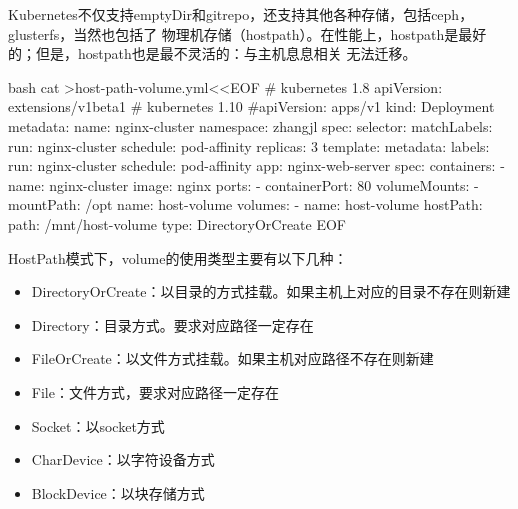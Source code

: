 Kubernetes不仅支持emptyDir和gitrepo，还支持其他各种存储，包括ceph，glusterfs，当然也包括了
物理机存储（hostpath）。在性能上，hostpath是最好的；但是，hostpath也是最不灵活的：与主机息息相关
无法迁移。
\begin{code-block}{bash}
cat >host-path-volume.yml<<EOF
# kubernetes 1.8
apiVersion: extensions/v1beta1
# kubernetes 1.10
#apiVersion: apps/v1
kind: Deployment
metadata:
  name: nginx-cluster
  namespace: zhangjl
spec:
  selector:
    matchLabels:
      run: nginx-cluster
      schedule: pod-affinity
  replicas: 3
  template:
    metadata:
      labels:
        run: nginx-cluster
        schedule: pod-affinity
        app: nginx-web-server
    spec:
      containers:
      - name: nginx-cluster
        image: nginx
        ports:
        - containerPort: 80
        volumeMounts:
          - mountPath: /opt
            name: host-volume
      volumes:
      - name: host-volume
        hostPath:
          path: /mnt/host-volume
          type: DirectoryOrCreate
EOF
\end{code-block}
HostPath模式下，volume的使用类型主要有以下几种：
\begin{itemize}
  \item DirectoryOrCreate：以目录的方式挂载。如果主机上对应的目录不存在则新建
  \item Directory：目录方式。要求对应路径一定存在
  \item FileOrCreate：以文件方式挂载。如果主机对应路径不存在则新建
  \item File：文件方式，要求对应路径一定存在
  \item Socket：以socket方式
  \item CharDevice：以字符设备方式
  \item BlockDevice：以块存储方式
\end{itemize}